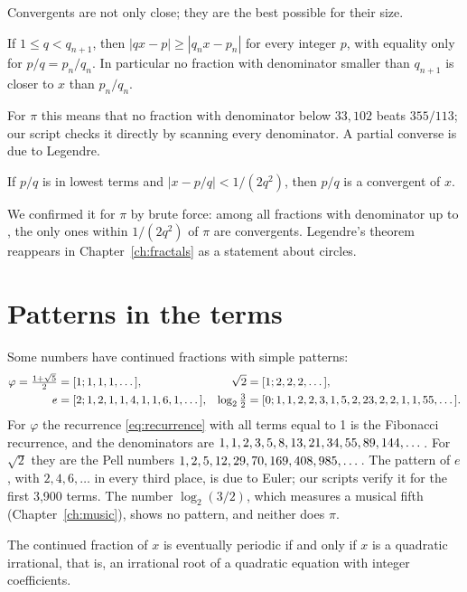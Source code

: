 Convergents are not only close; they are the best possible for their size.

\begin{theorem}\label{thm:best}
If $1 \le q < q_{n+1}$, then $|q x - p| \ge |q_n x - p_n|$ for every integer $p$, with equality only for $p/q = p_n/q_n$. In particular no fraction with denominator smaller than $q_{n+1}$ is closer to $x$ than $p_n/q_n$.
\end{theorem}

For $\pi$ this means that no fraction with denominator below $33{,}102$ beats $355/113$; our script checks it directly by scanning every denominator. A partial converse is due to Legendre.

\begin{theorem}\label{thm:legendre}
If $p/q$ is in lowest terms and $|x - p/q| < 1/(2q^2)$, then $p/q$ is a convergent of $x$.
\end{theorem}

We confirmed it for $\pi$ by brute force: among all fractions with denominator up to \LegendreQmax{}, the only ones within $1/(2q^2)$ of $\pi$ are convergents. Legendre's theorem reappears in Chapter~\ref{ch:fractals} as a statement about circles.

\section{Patterns in the terms}

Some numbers have continued fractions with simple patterns:
\begin{align*}
  \varphi = \tfrac{1 + \sqrt5}{2} &= [1; 1, 1, 1, \dots], & \sqrt2 &= [1; 2, 2, 2, \dots],\\
  e &= [2; 1, 2, 1, 1, 4, 1, 1, 6, 1, \dots], & \log_2\tfrac32 &= [0; 1, 1, 2, 2, 3, 1, 5, 2, 23, 2, 2, 1, 1, 55, \dots].
\end{align*}
For $\varphi$ the recurrence \eqref{eq:recurrence} with all terms equal to 1 is the Fibonacci recurrence, and the denominators are $1, 1, 2, 3, 5, 8, 13, 21, 34, 55, 89, 144, \dots$. For $\sqrt2$ they are the Pell numbers $1, 2, 5, 12, 29, 70, 169, 408, 985, \dots$. The pattern of $e$, with $2, 4, 6, \dots$ in every third place, is due to Euler; our scripts verify it for the first 3{,}900 terms. The number $\log_2(3/2)$, which measures a musical fifth (Chapter~\ref{ch:music}), shows no pattern, and neither does $\pi$.

\begin{theorem}\label{thm:lagrange}
The continued fraction of $x$ is eventually periodic if and only if $x$ is a quadratic irrational, that is, an irrational root of a quadratic equation with integer coefficients.
\end{theorem}


